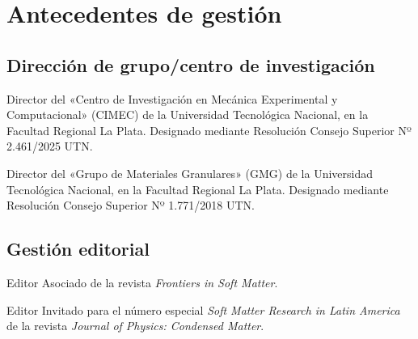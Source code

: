 \section{Antecedentes de gestión}

\subsection{Dirección de grupo/centro de investigación}

\begin{timeline}
   Director del «Centro de Investigación en Mecánica Experimental y Computacional» (CIMEC) de la Universidad Tecnológica Nacional, en la Facultad Regional La Plata. Designado mediante Resolución Consejo Superior Nº 2.461/2025 UTN.

   Director del «Grupo de Materiales Granulares» (GMG) de la Universidad Tecnológica Nacional, en la Facultad Regional La Plata. Designado mediante Resolución Consejo Superior Nº 1.771/2018 UTN.
\end{timeline}

\subsection{Gestión editorial}

\begin{timeline}
   Editor Asociado de la revista \textit{Frontiers in Soft Matter}.

   Editor Invitado para el número especial \textit{Soft Matter Research in Latin America} de la revista \textit{Journal of Physics: Condensed Matter}.
\end{timeline}

